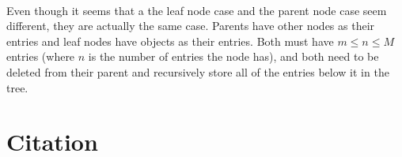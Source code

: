\documentclass{article}
\begin{document}
\paragraph{}
Even though it seems that a the leaf node case and the parent node case seem different, they are actually the same case. Parents have
other nodes as their entries and leaf nodes have objects as their entries. Both must have $m \le n \le M$ entries (where $n$ is the number
of entries the node has), and both need to be deleted from their parent and recursively store all of the entries below it in the tree.
\section{Citation}



\end{document}
